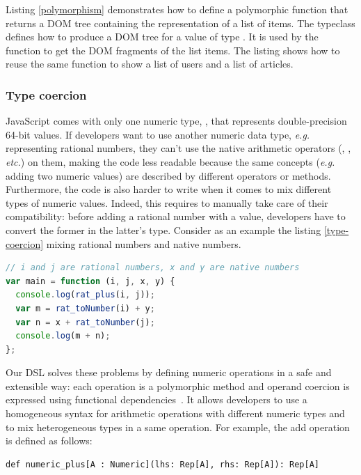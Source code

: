 \documentclass[american,english,runningheads]{llncs}
\newcommand{\eg}{\emph{e.g.}}
\newcommand{\etc}{\emph{etc.}}
\begin{document}
Listing \ref{polymorphism} demonstrates how to define a polymorphic  function that returns a DOM
tree containing the representation of a list of items. The  typeclass defines how to produce a DOM tree
for a value of type . It is used by the  function to get the DOM fragments of the list
items. The listing shows how to reuse the same  function to show a list of users and a list of
articles.

\subsubsection{Type coercion}

JavaScript comes with only one numeric type, , that represents double-precision 64-bit values. If
developers want to use another numeric data type, \eg{} representing rational numbers, they can’t use the native
arithmetic operators (\code{+}, \code{-}, \etc) on them, making the code less readable because the same concepts
(\eg{} adding two numeric values) are described by different operators or methods. Furthermore, the code is also
harder to write when it comes to mix different types of numeric values. Indeed, this requires to manually take care
of their compatibility: before adding a rational number with a  value, developers have to convert the
former in the latter’s type. Consider as an example the listing \ref{type-coercion} mixing rational numbers and
native numbers.

\begin{lstlisting}[language=JavaScript,label=type-coercion,caption=Mixing integer and floating-point arithmetic in
JavaScript.]
// i and j are rational numbers, x and y are native numbers
var main = function (i, j, x, y) {
  console.log(rat_plus(i, j));
  var m = rat_toNumber(i) + y;
  var n = x + rat_toNumber(j);
  console.log(m + n);
};
\end{lstlisting}


Our DSL solves these problems by defining numeric operations in a safe and extensible way: each operation is a
polymorphic method and operand coercion is expressed using functional dependencies~\cite{Jones00_FunDeps}. It allows
developers to use a homogeneous syntax for arithmetic operations with different numeric types and to mix
heterogeneous types in a same operation. For example, the add operation is defined as follows:

\begin{lstlisting}
def numeric_plus[A : Numeric](lhs: Rep[A], rhs: Rep[A]): Rep[A]
\end{lstlisting}
\end{document}
